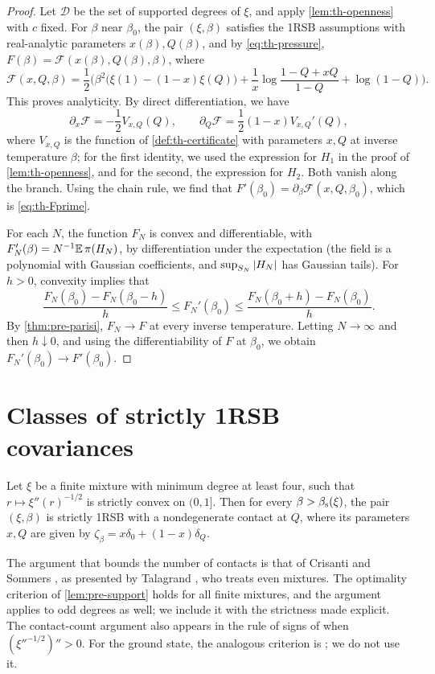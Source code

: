 \begin{proof}
Let $\mathcal D$ be the set of supported degrees of $\xi$, and apply \cref{lem:th-openness} with $c$ fixed. For $\beta$ near $\beta_0$, the pair $(\xi,\beta)$ satisfies the 1RSB assumptions with real-analytic parameters $x(\beta),Q(\beta)$, and by \eqref{eq:th-pressure}, $F(\beta)=\mathcal F(x(\beta),Q(\beta),\beta)$, where
\[
\mathcal F(x,Q,\beta)=\frac12\Big(\beta^2\big(\xi(1)-(1-x)\xi(Q)\big)+\frac1x\log\frac{1-Q+xQ}{1-Q}+\log(1-Q)\Big).
\]
This proves analyticity. By direct differentiation, we have
\[
\partial_x\mathcal F=-\frac12V_{x,Q}(Q),\qquad\partial_Q\mathcal F=\frac12(1-x)V_{x,Q}'(Q),
\]
where $V_{x,Q}$ is the function of \cref{def:th-certificate} with parameters $x,Q$ at inverse temperature $\beta$; for the first identity, we used the expression for $H_1$ in the proof of \cref{lem:th-openness}, and for the second, the expression for $H_2$. Both vanish along the branch. Using the chain rule, we find that $F'(\beta_0)=\partial_\beta\mathcal F(x,Q,\beta_0)$, which is \eqref{eq:th-Fprime}.

For each $N$, the function $F_N$ is convex and differentiable, with $F_N'(\beta)=N^{-1}\mathbb E\,\pi(H_N)$, by differentiation under the expectation (the field is a polynomial with Gaussian coefficients, and $\sup_{S_N}\left|H_N\right|$ has Gaussian tails). For $h>0$, convexity implies that
\[
\frac{F_N(\beta_0)-F_N(\beta_0-h)}h\le F_N'(\beta_0)\le\frac{F_N(\beta_0+h)-F_N(\beta_0)}h.
\]
By \cref{thm:pre-parisi}, $F_N\to F$ at every inverse temperature. Letting $N\to\infty$ and then $h\downarrow0$, and using the differentiability of $F$ at $\beta_0$, we obtain $F_N'(\beta_0)\to F'(\beta_0)$.
\end{proof}

\section{Classes of strictly 1RSB covariances}\label{sec:th-classes}

\begin{proposition}\label{prop:th-convex}
Let $\xi$ be a finite mixture with minimum degree at least four, such that $r\mapsto\xi''(r)^{-1/2}$ is strictly convex on $(0,1]$. Then for every $\beta>\beta_{\mathrm s}(\xi)$, the pair $(\xi,\beta)$ is strictly 1RSB with a nondegenerate contact at $Q$, where its parameters $x,Q$ are given by $\zeta_\beta=x\delta_0+(1-x)\delta_Q$.
\end{proposition}

The argument that bounds the number of contacts is that of Crisanti and Sommers \cite{CrisantiSommers1992}, as presented by Talagrand \cite[Proposition~2.2]{Talagrand2006}, who treats even mixtures. The optimality criterion of \cref{lem:pre-support} holds for all finite mixtures, and the argument applies to odd degrees as well; we include it with the strictness made explicit. The contact-count argument also appears in the rule of signs of \cite[Theorem~1.3(1) and Remark~1.4]{JagannathTobasco2018contacts} when $(\xi''^{-1/2})''>0$. For the ground state, the analogous criterion is \cite[Lemma~3.21]{HuangSellke2024}; we do not use it.

